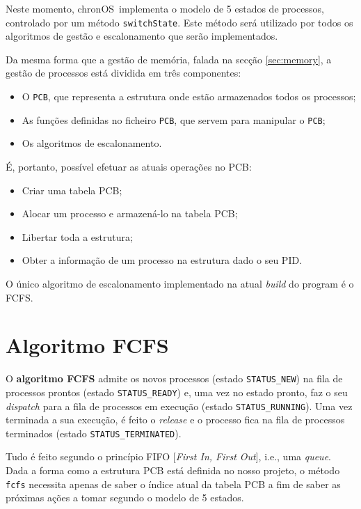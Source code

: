 \documentclass[10pt,oneside]{estiloUBI}
\newcommand{\chronOS}{\textsf{chronOS}}
\begin{document}
	Neste momento, \chronOS~implementa o modelo de 5 estados de processos, controlado por um método \verb|switchState|. Este método será utilizado por todos os algoritmos de gestão e escalonamento que serão implementados.
	
	Da mesma forma que a gestão de memória, falada na secção \ref{sec:memory}, a gestão de processos está dividida em três componentes:
	
	\begin{itemize} %
	    \item O \texttt{\ac{PCB}}, que representa a estrutura onde estão armazenados todos os processos;
	    \item As funções definidas no ficheiro \texttt{\ac{PCB}}, que servem para manipular o \texttt{\ac{PCB}};
	    \item Os algoritmos de escalonamento.
	\end{itemize}  
	
	É, portanto, possível efetuar as atuais operações no \ac{PCB}:
	\begin{itemize}
	    \item Criar uma tabela \ac{PCB};
	    \item Alocar um processo e armazená-lo na tabela \ac{PCB};
	    \item Libertar toda a estrutura;
	    \item Obter a informação de um processo na estrutura dado o seu \ac{PID}.
	\end{itemize}
	
	O único algoritmo de escalonamento implementado na atual \textit{build} do program é o \ac{FCFS}.
	
	
	\section{Algoritmo \ac{FCFS}}
	\label{ssec:process:fcfs}
	
	O \textbf{algoritmo \ac{FCFS}} admite os novos processos (estado \texttt{STATUS\_NEW}) na fila de processos prontos (estado \texttt{STATUS\_READY}) e, uma vez no estado pronto, faz o seu \textit{dispatch} para a fila de processos em execução (estado \texttt{STATUS\_RUNNING}). Uma vez terminada a sua execução, é feito o \textit{release} e o processo fica na fila de processos terminados (estado \texttt{STATUS\_TERMINATED}).
	
	Tudo é feito segundo o princípio FIFO [\textit{First In, First Out}], i.e., uma \textit{queue}. Dada a forma como a estrutura \ac{PCB} está definida no nosso projeto, o método \verb|fcfs| necessita apenas de saber o índice atual da tabela \ac{PCB} a fim de saber as próximas ações a tomar segundo o modelo de 5 estados.
	
\end{document}
